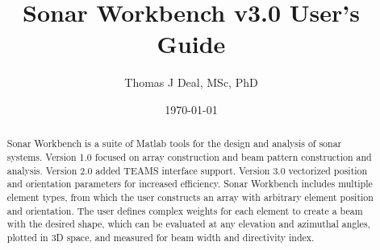\documentclass[11pt]{article}
\begin{document}
\title{Sonar Workbench v3.0 User's Guide}
\author{Thomas J Deal, MSc, PhD}
\date{\today}
\maketitle

\begin{abstract}
Sonar Workbench is a suite of Matlab tools for the design and analysis of sonar systems. Version 1.0 focused on array construction and beam pattern construction and analysis. Version 2.0 added TEAMS interface support. Version 3.0 vectorized position and orientation parameters for increased efficiency. Sonar Workbench includes multiple element types, from which the user constructs an array with arbitrary element position and orientation. The user defines complex weights for each element to create a beam with the desired shape, which can be evaluated at any elevation and azimuthal angles, plotted in 3D space, and measured for beam width and directivity index.
\end{abstract}

\newpage
\tableofcontents
\listoftables
\listoffigures








\newpage


\end{document}
